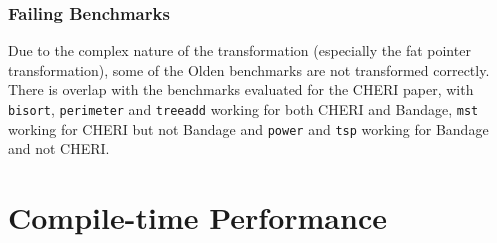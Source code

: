 \subsubsection{Failing Benchmarks}

Due to the complex nature of the transformation (especially the fat pointer transformation), some of the Olden benchmarks are not transformed correctly.
There is overlap with the benchmarks evaluated for the CHERI paper, with \verb!bisort!, \verb!perimeter! and \verb!treeadd! working for both CHERI and Bandage, \verb!mst! working for CHERI but not Bandage and \verb!power! and \verb!tsp! working for Bandage and not CHERI.


%
%
%
%

\section{Compile-time Performance}

